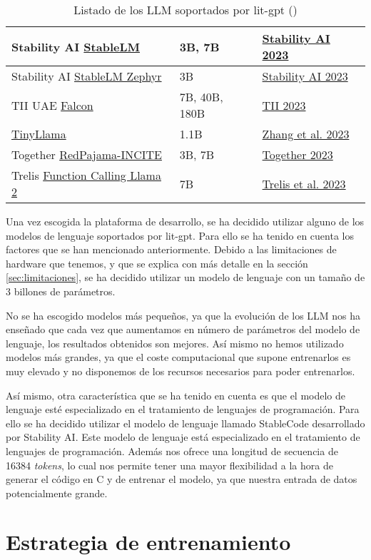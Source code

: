 \begin{table}[H]
{\begin{tabular}{|l|l|l|}
        \hline
        Stability AI \href{tutorials/download_stablelm.md}{StableLM} & 3B, 7B & \href{https://github.com/Stability-AI/StableLM}{Stability AI 2023} \\
        \hline
        Stability AI \href{tutorials/download_stablelm.md}{StableLM Zephyr} & 3B & \href{https://stability.ai/blog/stablecode-llm-generative-ai-coding}{Stability AI 2023} \\
        \hline
        TII UAE \href{tutorials/download_falcon.md}{Falcon} & 7B, 40B, 180B & \href{https://falconllm.tii.ae}{TII 2023} \\
        \hline
        \href{tutorials/download_tinyllama.md}{TinyLlama} & 1.1B & \href{https://github.com/jzhang38/TinyLlama}{Zhang et al. 2023} \\
        \hline
        Together \href{tutorials/download_redpajama_incite.md}{RedPajama-INCITE} & 3B, 7B & \href{https://together.ai/blog/redpajama-models-v1}{Together 2023} \\
        \hline
        Trelis \href{tutorials/download_function_calling_llama_2.md}{Function Calling Llama 2} & 7B & \href{https://huggingface.co/Trelis/Llama-2-7b-chat-hf-function-calling-v2}{Trelis et al. 2023} \\
        \hline
    \end{tabular}%
    }
    \caption[Listado de los LLM soportados por lit-gpt]{Listado de los LLM soportados por lit-gpt (\cite{litGPT})}
    \label{tab:litGPT}
\end{table}

Una vez escogida la plataforma de desarrollo, se ha decidido utilizar alguno de los
modelos de lenguaje soportados por lit-gpt. Para ello se ha tenido en cuenta los
factores que se han mencionado anteriormente. Debido a las limitaciones de hardware
que tenemos, y que se explica con más detalle en la sección \ref{sec:limitaciones},
se ha decidido utilizar un modelo de lenguaje con un tamaño de 3 billones de parámetros.

No se ha escogido modelos más pequeños, ya que la evolución de los LLM nos ha enseñado
que cada vez que aumentamos en número de parámetros del modelo de lenguaje, los resultados
obtenidos son mejores. Así mismo no hemos utilizado modelos más grandes, ya que el coste
computacional que supone entrenarlos es muy elevado y no disponemos de los recursos
necesarios para poder entrenarlos.

Así mismo, otra característica que se ha tenido en cuenta es que el modelo de lenguaje
esté especializado en el tratamiento de lenguajes de programación. Para ello se ha
decidido utilizar el modelo de lenguaje llamado StableCode\cite{StableCode} desarrollado
por Stability AI. Este modelo de lenguaje está especializado en el tratamiento de lenguajes
de programación. Además nos ofrece una longitud de secuencia de 16384 \textit{tokens}, lo cual
nos permite tener una mayor flexibilidad a la hora de generar el código en C y de entrenar
el modelo, ya que nuestra entrada de datos potencialmente grande.

\section{Estrategia de entrenamiento}
\label{sec:estrategia_entrenamiento}







